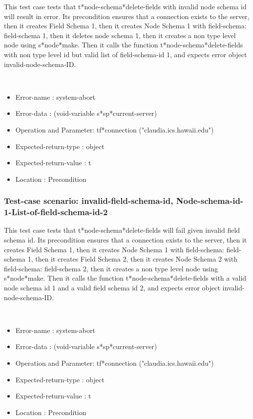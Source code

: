 This test case tests that t*node-schema*delete-fields with invalid node schema id will result in error.
Its precondition ensures that a connection exists to the server, then it creates Field Schema 1, then it creates Node Schema 1 with field-schema: field-schema 1, then it deletes node schema 1, then it creates a non type level node using s*node*make.
Then it calls the function t*node-schema*delete-fields  with non type level id but valid list of field-schema-id 1, and expects error object invalid-node-schema-ID.



\
\begin {itemize}
\item 	Error-name             : system-abort
\item Error-data             : (void-variable s*sp*current-server)
\item Operation and Parameter: tf*connection ("claudia.ics.hawaii.edu")
\item Expected-return-type   : object
\item Expected-return-value  : t
\item Location               : Precondition



\end {itemize}
\subsubsection {Test-case scenario: invalid-field-schema-id, Node-schema-id-1-List-of-field-schema-id-2}


This test case tests that t*node-schema*delete-fields will fail given invalid field schema id.
Its precondition ensures that a connection exists to the server, then it creates Field Schema 1, then it creates Node Schema 1 with field-schema: field-schema 1, then it creates Field Schema 2, then it creates Node Schema 2 with field-schema: field-schema 2, then it creates a non type level node using s*node*make.
Then it calls the function t*node-schema*delete-fields  with a valid node schema id 1 and a valid field schema id 2, and expects error object invalid-node-schema-ID.



\
\begin {itemize}
\item 	Error-name             : system-abort
\item Error-data             : (void-variable s*sp*current-server)
\item Operation and Parameter: tf*connection ("claudia.ics.hawaii.edu")
\item Expected-return-type   : object
\item Expected-return-value  : t
\item Location               : Precondition



\end {itemize}
